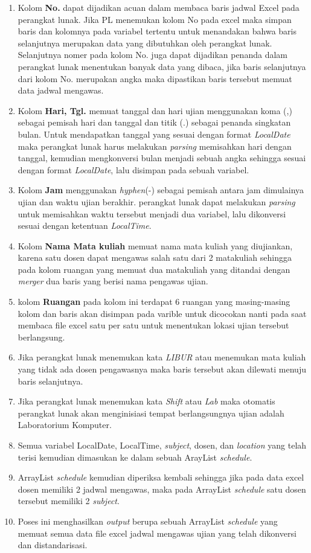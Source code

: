 \begin{enumerate}
	\item Kolom \textbf{No.} dapat dijadikan acuan dalam membaca baris jadwal Excel pada perangkat lunak. Jika PL menemukan kolom No pada excel maka simpan baris dan kolomnya pada variabel tertentu untuk menandakan bahwa baris selanjutnya merupakan data yang dibutuhkan oleh perangkat lunak. Selanjutnya nomer pada kolom No. juga dapat dijadikan penanda dalam perangkat lunak menentukan banyak data yang dibaca, jika baris selanjutnya dari kolom No. merupakan angka maka dipastikan baris tersebut memuat data jadwal mengawas.
		\item Kolom \textbf{Hari, Tgl.} memuat tanggal dan hari ujian menggunakan koma (,) sebagai pemisah hari dan tanggal dan titik (.) sebagai penanda singkatan bulan. Untuk mendapatkan tanggal yang sesuai dengan format \textit{LocalDate} maka perangkat lunak harus melakukan \textit{parsing} memisahkan hari dengan tanggal, kemudian mengkonversi bulan menjadi sebuah angka sehingga sesuai dengan format \textit{LocalDate}, lalu disimpan pada sebuah variabel.
		\item Kolom \textbf{Jam} menggunakan \textit{hyphen}(-) sebagai pemisah antara jam dimulainya ujian dan waktu ujian berakhir. perangkat lunak dapat melakukan \textit{parsing} untuk memisahkan waktu tersebut menjadi dua variabel, lalu dikonversi sesuai dengan ketentuan \textit{LocalTime}.
		\item Kolom \textbf{Nama Mata kuliah} memuat nama mata kuliah yang diujiankan, karena satu dosen dapat mengawas salah satu dari 2 matakuliah sehingga pada kolom ruangan yang memuat dua matakuliah yang ditandai dengan \textit{merger} dua baris yang berisi nama pengawas ujian.
		\item kolom \textbf{Ruangan} pada kolom ini terdapat 6 ruangan yang masing-masing kolom dan baris akan disimpan pada varible untuk dicocokan nanti pada saat membaca file excel satu per satu untuk menentukan lokasi ujian tersebut berlangsung.
		\item Jika perangkat lunak menemukan kata \textit{LIBUR} atau menemukan mata kuliah yang tidak ada dosen pengawasnya maka baris tersebut akan dilewati menuju baris selanjutnya.
		\item Jika perangkat lunak menemukan kata \textit{Shift} atau \textit{Lab} maka otomatis perangkat lunak akan menginisiasi tempat berlangsungnya ujian adalah Laboratorium Komputer.
		\item Semua variabel LocalDate, LocalTime, \textit{subject}, dosen, dan \textit{location} yang telah terisi kemudian dimasukan ke dalam sebuah ArayList \textit{schedule}.
		\item ArrayList \textit{schedule} kemudian diperiksa kembali sehingga jika pada data excel dosen memiliki 2 jadwal mengawas, maka pada ArrayList \textit{schedule} satu dosen tersebut memiliki 2 \textit{subject}.
		\item Poses ini menghasilkan \textit{output} berupa sebuah ArrayList \textit{schedule} yang memuat semua data file excel jadwal mengawas ujian yang telah dikonversi dan distandarisasi. 
\end{enumerate}

